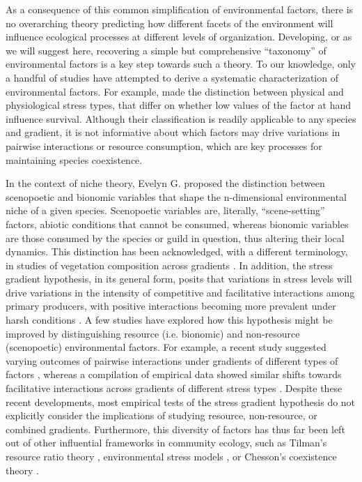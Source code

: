As a consequence of this common simplification of environmental factors, there is no overarching theory predicting how different facets of the environment will influence ecological processes at different levels of organization. Developing, or as we will suggest here, recovering a simple but comprehensive “taxonomy” of environmental factors is a key step towards such a theory. To our knowledge, only a handful of studies have attempted to derive a systematic characterization of environmental factors. For example, \cite{Menge1987} made the distinction between physical and physiological stress types, that differ on whether low values of the factor at hand influence survival. Although their classification is readily applicable to any species and gradient, it is not informative about which factors may drive variations in pairwise interactions or resource consumption, which are key processes for maintaining species coexistence.

In the context of niche theory, Evelyn G. \cite{Hutchinson1978} proposed the distinction between scenopoetic and bionomic variables that shape the n-dimensional environmental niche of a given species. Scenopoetic variables are, literally, “scene-setting” factors, abiotic conditions that cannot be consumed, whereas bionomic variables are those consumed by the species or guild in question, thus altering their local dynamics. This distinction has been acknowledged, with a different terminology, in studies of vegetation composition across gradients \citep{Austin1990}. In addition, the stress gradient hypothesis, in its general form, posits that variations in stress levels will drive variations in the intensity of competitive and facilitative interactions among primary producers, with positive interactions becoming more prevalent under harsh conditions \citep{Bertness1994}. A few studies have explored how this hypothesis might be improved by distinguishing resource (i.e. bionomic) and non-resource (scenopoetic) environmental factors. For example, a recent study suggested varying outcomes of pairwise interactions under gradients of different types of factors \citep{Maestre2009}, whereas a compilation of empirical data showed similar shifts towards facilitative interactions across gradients of different stress types \citep{He2013}. Despite these recent developments, most empirical tests of the stress gradient hypothesis do not explicitly consider the implications of studying resource, non-resource, or combined gradients. Furthermore, this diversity of factors has thus far been left out of other influential frameworks in community ecology, such as Tilman’s resource ratio theory \citep{Tilman1980, Miller2005}, environmental stress models \citep{Menge1987}, or Chesson’s coexistence theory \citep{Chesson2000}.


